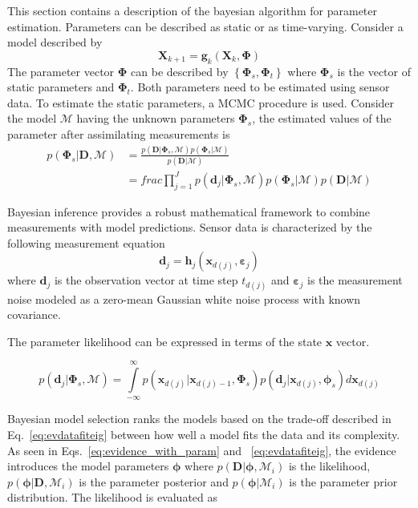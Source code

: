 \documentclass[]{elsarticle}
\renewcommand{\vec}[1]{\mathbf{#1}}
\begin{document}
This section contains a description of the bayesian algorithm for parameter estimation. Parameters can be described as static or as time-varying. Consider a model described by
\begin{equation}
\vec{X}_{k+1} = \vec{g}_k(\vec{X}_k, \vec{\Phi})
\end{equation}
The parameter vector $\vec{\Phi}$ can be described by $\left\lbrace  \vec{\Phi}_s, \vec{\Phi}_t \right\rbrace$ where $\vec{\Phi}_s$ is the vector of static parameters and $\vec{\Phi}_t$. Both parameters need to be estimated using sensor data. To estimate the static parameters, a MCMC procedure is used. Consider the model $\mathcal{M}$ having the unknown parameters $\vec{\Phi}_s$, the estimated values of the parameter after assimilating measurements is
\begin{align}
p(\vec{\Phi}_s | \vec{D}, \mathcal{M}) &= \frac{p(\vec{D} | \vec{\Phi}_s, \mathcal{M}) p( \vec{\Phi}_s | \mathcal{M})}{p(\vec{D} | \mathcal{M})} \\
&= frac{  \prod_{j=1}^J p(\vec{d}_j | \vec{\Phi}_s, \mathcal{M}) p( \vec{\Phi}_s | \mathcal{M})}{p(\vec{D} | \mathcal{M})}
\end{align}

 Bayesian inference provides a robust mathematical framework to combine measurements with model predictions. Sensor data is characterized by the following measurement equation~\cite{Evensen2009,jazwinski1970stochastic,prob}
\begin{equation}
 \vec{d}_{j} = \vec{h}_{j} (\vec{x}_{d(j)}, \vec{\varepsilon}_{j}) \label{eq:meas}
\end{equation}
where $\vec{d}_{j}$ is the observation vector at time step $t_{d(j)}$ and $\vec{\varepsilon}_j$ is the measurement noise modeled as a zero-mean Gaussian white noise process with known covariance.

The parameter likelihood can be expressed in terms of the state $\vec{x}$ vector.

\begin{equation}
p(\vec{d}_j | \vec{\Phi}_s, \mathcal{M}) = \int\limits_{-\infty}^{\infty} p( \vec{x}_{d(j)} | \vec{x}_{d(j)-1}, \vec{\Phi}_s) p(\vec{d}_j | \vec{x}_{d(j)} , \vec{\phi}_s) d \vec{x}_{d(j)}
\end{equation}

Bayesian model selection ranks the models based on the trade-off described in Eq.~\eqref{eq:evdatafiteig} between how well a model fits the data and its complexity. As seen in Eqs.~\eqref{eq:evidence_with_param} and ~\eqref{eq:evdatafiteig}, the evidence introduces the model parameters $\vec{\phi}$ where $p(\vec{D} |\vec{\phi},\mathcal{M}_i)$ is the likelihood, $p(\vec{\phi} |\vec{D},\mathcal{M}_i)$ is the parameter posterior and $ p(\vec{\phi}|\mathcal{M}_i)$ is the parameter prior distribution. The likelihood is evaluated as~\cite{prob,bisaillon2015bayesian,sandhu2016bayesian}
\end{document}
